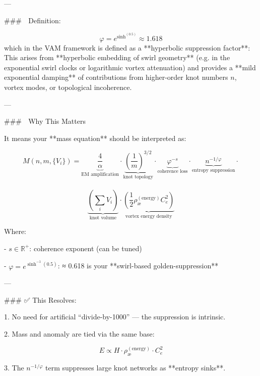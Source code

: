 \documentclass[11pt]{article}
\begin{document}
    ---

    ### 📐 Definition:

    $$
    \varphi = e^{\sinh^{(0.5)}} \approx 1.618
    $$
    which in the VAM framework is defined  as a **hyperbolic suppression factor**:
    This arises from **hyperbolic embedding of swirl geometry** (e.g. in the exponential swirl clocks or logarithmic vortex attenuation) and provides a **mild exponential damping** of contributions from higher-order knot numbers $n$, vortex modes, or topological incoherence.

    ---

    ### 🧠 Why This Matters

    It means your **mass equation** should be interpreted as:


    $$ M(n, m, \{V_i\}) = \underbrace{\frac{4}{\alpha}}_{\text{EM amplification}} \cdot  \underbrace{\left( \frac{1}{m} \right)^{3/2}}_{\text{knot topology}} \cdot  \underbrace{\varphi^{-s}}_{\text{coherence loss}} \cdot \underbrace{n^{-1/\varphi}}_{\text{entropy suppression}} \cdot $$\\
    $$ \underbrace{\left( \sum_i V_i \right)}_{\text{knot volume}} \cdot  \underbrace{\left( \frac{1}{2} \rho_\text{\ae}^{(\text{energy})} C_e^2 \right)}_{\text{vortex energy density}}
    $$

    Where:

    -   $s \in \mathbb{R}^{+}$: coherence exponent (can be tuned)

    -   $\varphi = e^{\sinh^{-1}(0.5)}$: ≈ 0.618 is your **swirl-based golden-suppression**


    ---

    ### ✅ This Resolves:

    1.  No need for artificial “divide-by-1000” — the suppression is intrinsic.

    2.  Mass and anomaly are tied via the same base:

    $$
    E \propto H \cdot \rho_\text{\ae}^{(\text{energy})} \cdot C_e^2
    $$

    3.  The $n^{-1/\varphi}$ term suppresses large knot networks as **entropy sinks**.
\end{document}
